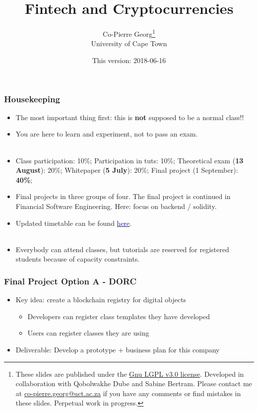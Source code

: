\documentclass[10pt]{beamer}
\title
{Fintech and Cryptocurrencies}
\author[Co-Pierre Georg]
{
Co-Pierre Georg\footnote{These slides are published under the \href{https://www.gnu.org/licenses/lgpl-3.0.en.html}{Gnu LGPL v3.0 license}. Developed in collaboration with Qobolwakhe Dube and Sabine Bertram. Please contact me at \url{co-pierre.georg@uct.ac.za} if you have any comments or find mistakes in these slides. Perpetual work in progress.}\\
University of Cape Town
}
\date
{This version: 2018-06-16}
\begin{document}
\begin{frame}
  \titlepage
\end{frame}

\begin{frame}
  \frametitle{Housekeeping}
  \begin{itemize}
    \item The most important thing first: this is \textbf{not} supposed to be a normal class!!
    \item You are here to learn and experiment, not to pass an exam.\\
    ~\\
    \pause
    \item Class participation: 10\%; Participation in tuts: 10\%; Theoretical exam (\textbf{13 August}): 20\%; Whitepaper (\textbf{5 July}): 20\%; Final project (1 September): \textbf{40\%};\\
    \item Final projects in three groups of four. The final project is continued in Financial Software Engineering. Here: focus on backend / solidity.
    ~\\
    \pause
    \item Updated timetable can be found \href{https://docs.google.com/spreadsheets/d/1pKzULj4H33-thAPFxcg1UaOOD9w4S7uBTE4fMKJN8kA/edit?usp=sharing}{\textcolor{blue}{here}}.\\
    ~\\
    \pause
    \item Everybody can attend classes, but tutorials are reserved for registered students because of capacity constraints.
  \end{itemize}
\end{frame}

\begin{frame}
  \frametitle{Final Project Option A - DORC}
  \begin{itemize}\itemsep10pt
    \item Key idea: create a blockchain registry for digital objects
    \begin{itemize}\itemsep5pt
      \item Developers can register class templates they have developed
      \item Users can register classes they are using
    \end{itemize}
    \item Deliverable: Develop a prototype + business plan for this company
  \end{itemize}
\end{frame}
\end{document}
